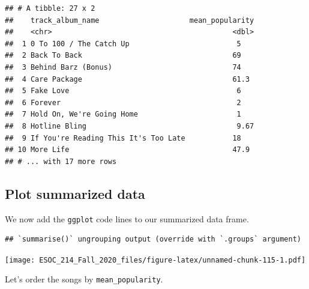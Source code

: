 \documentclass[
]{book}
\newenvironment{Shaded}{\begin{snugshade}}{\end{snugshade}}
\newcommand{\DataTypeTok}[1]{\textcolor[rgb]{0.13,0.29,0.53}{#1}}
\newcommand{\KeywordTok}[1]{\textcolor[rgb]{0.13,0.29,0.53}{\textbf{#1}}}
\newcommand{\NormalTok}[1]{#1}
\newcommand{\OperatorTok}[1]{\textcolor[rgb]{0.81,0.36,0.00}{\textbf{#1}}}
\newcommand{\StringTok}[1]{\textcolor[rgb]{0.31,0.60,0.02}{#1}}
\begin{document}
\begin{verbatim}
## # A tibble: 27 x 2
##    track_album_name                     mean_popularity
##    <chr>                                          <dbl>
##  1 0 To 100 / The Catch Up                         5   
##  2 Back To Back                                   69   
##  3 Behind Barz (Bonus)                            74   
##  4 Care Package                                   61.3 
##  5 Fake Love                                       6   
##  6 Forever                                         2   
##  7 Hold On, We're Going Home                       1   
##  8 Hotline Bling                                   9.67
##  9 If You're Reading This It's Too Late           18   
## 10 More Life                                      47.9 
## # ... with 17 more rows
\end{verbatim}

\hypertarget{plot-summarized-data}{%
\subsection{Plot summarized data}\label{plot-summarized-data}}

We now add the \texttt{ggplot} code lines to our summarized data frame.

\begin{Shaded}
\end{Shaded}

\begin{verbatim}
## `summarise()` ungrouping output (override with `.groups` argument)
\end{verbatim}

\texttt{[image: ESOC\_214\_Fall\_2020\_files/figure-latex/unnamed-chunk-115-1.pdf]}

Let's order the songs by \texttt{mean\_popularity}.

\begin{Shaded}
\end{Shaded}
\end{document}
